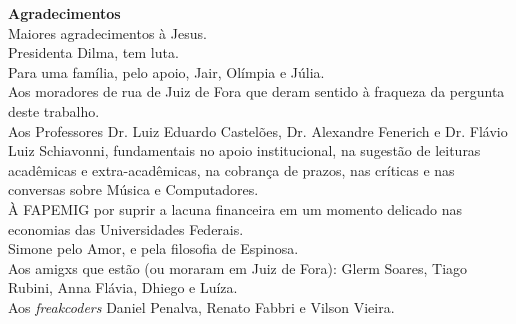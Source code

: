 \newpage
\begin{flushright}
\huge{\textbf{Agradecimentos}}
\ \\
\small{Maiores agradecimentos à Jesus.  
\ \\
Presidenta Dilma, tem luta.
\ \\
Para uma família, pelo apoio, Jair, Olímpia e Júlia. 
\ \\
Aos moradores de rua de Juiz de Fora que deram sentido à fraqueza da pergunta deste trabalho.
\ \\
Aos Professores Dr. Luiz Eduardo Castelões, Dr. Alexandre Fenerich e Dr. Flávio Luiz Schiavonni, fundamentais no apoio institucional, na sugestão de leituras acadêmicas e extra-acadêmicas, na cobrança de prazos, nas críticas e nas conversas sobre Música e Computadores.
\ \\
À FAPEMIG por suprir a lacuna financeira em um momento delicado nas economias das Universidades Federais.
\\
Simone pelo Amor, e pela filosofia de Espinosa.
\ \\
Aos amigxs que estão (ou moraram em Juiz de Fora): Glerm Soares, Tiago Rubini, Anna Flávia, Dhiego e Luíza.
\ \\
Aos \emph{freakcoders} Daniel Penalva, Renato Fabbri e Vilson Vieira. }
\end{flushright}

\newpage